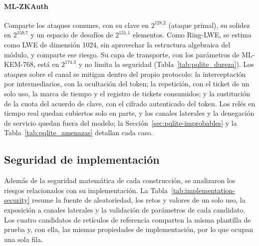 \paragraph{ML-ZKAuth}
Comparte los ataques comunes, con su clave en $2^{128.2}$ (ataque primal), su solidez en $2^{150.7}$ y un espacio de desafíos de $2^{131.1}$ elementos. Como Ring-LWE, se estima como LWE de dimensión 1024, sin aprovechar la estructura algebraica del módulo, y comparte ese riesgo. Su capa de transporte, con los parámetros de ML-KEM-768, está en $2^{174.3}$ y no limita la seguridad (Tabla~\ref{tab:pqlite_dureza}). Los ataques sobre el canal se mitigan dentro del propio protocolo: la interceptación por intermediarios, con la ocultación del token; la repetición, con el ticket de un solo uso, la marca de tiempo y el registro de tickets consumidos; y la sustitución de la cuota del acuerdo de clave, con el cifrado autenticado del token. Los relés en tiempo real quedan cubiertos solo en parte, y los canales laterales y la denegación de servicio quedan fuera del modelo; la Sección~\ref{sec:pqlite-improbables} y la Tabla~\ref{tab:pqlite_amenazas} detallan cada caso.


\subsection{Seguridad de implementación}
\label{sec:implementation-security}

Además de la seguridad matemática de cada construcción, se analizaron los riesgos relacionados con su implementación. La Tabla~\ref{tab:implementation-security} resume la fuente de aleatoriedad, los retos y valores de un solo uso, la exposición a canales laterales y la validación de parámetros de cada candidato. Los cuatro candidatos de retículos de referencia comparten la misma plantilla de prueba y, con ella, las mismas propiedades de implementación, por lo que ocupan una sola fila.

